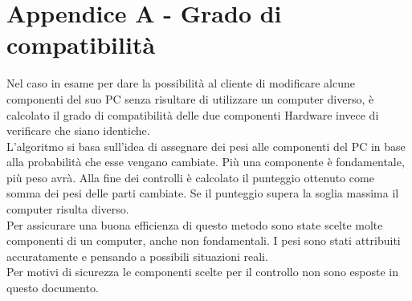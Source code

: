 
\chapter{Appendice A - Grado di compatibilità}
\label{cap:appA}

Nel caso in esame per dare la possibilità al cliente di modificare alcune componenti del suo PC senza risultare di utilizzare un computer diverso, è calcolato il grado di compatibilità delle due componenti Hardware invece di verificare che siano identiche.\\ 
L'algoritmo si basa sull'idea di assegnare dei pesi alle componenti del PC in base alla probabilità che esse vengano cambiate. Più una componente è fondamentale, più peso avrà. Alla fine dei controlli è calcolato il punteggio ottenuto come somma dei pesi delle parti cambiate. Se il punteggio supera la soglia massima il computer risulta diverso.
\\Per assicurare una buona efficienza di questo metodo sono state scelte molte componenti di un computer, anche non fondamentali. I pesi sono stati attribuiti accuratamente e pensando a possibili situazioni reali.
\\Per motivi di sicurezza le componenti scelte per il controllo non sono esposte in questo documento.




